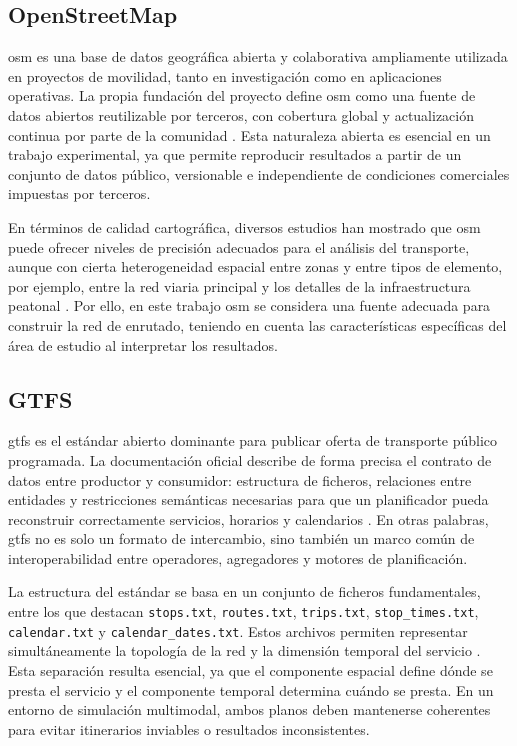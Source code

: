 \subsection{OpenStreetMap}

\gls{osm} es una base de datos geográfica abierta y colaborativa ampliamente utilizada en proyectos de movilidad, tanto en investigación como en aplicaciones operativas. La propia fundación del proyecto define \gls{osm} como una fuente de datos abiertos reutilizable por terceros, con cobertura global y actualización continua por parte de la comunidad \cite{OSMAbout}. Esta naturaleza abierta es esencial en un trabajo experimental, ya que permite reproducir resultados a partir de un conjunto de datos público, versionable e independiente de condiciones comerciales impuestas por terceros.\newline

En términos de calidad cartográfica, diversos estudios han mostrado que \gls{osm} puede ofrecer niveles de precisión adecuados para el análisis del transporte, aunque con cierta heterogeneidad espacial entre zonas y entre tipos de elemento, por ejemplo, entre la red viaria principal y los detalles de la infraestructura peatonal \cite{Haklay2010}. Por ello, en este trabajo \gls{osm} se considera una fuente adecuada para construir la red de enrutado, teniendo en cuenta las características específicas del área de estudio al interpretar los resultados.

\subsection{GTFS}

\gls{gtfs} es el estándar abierto dominante para publicar oferta de transporte público programada. La documentación oficial describe de forma precisa el contrato de datos entre productor y consumidor: estructura de ficheros, relaciones entre entidades y restricciones semánticas necesarias para que un planificador pueda reconstruir correctamente servicios, horarios y calendarios \cite{GTFSReference}. En otras palabras, \gls{gtfs} no es solo un formato de intercambio, sino también un marco común de interoperabilidad entre operadores, agregadores y motores de planificación.

La estructura del estándar se basa en un conjunto de ficheros fundamentales, entre los que destacan \texttt{stops.txt}, \texttt{routes.txt}, \texttt{trips.txt}, \texttt{stop\_times.txt}, \texttt{calendar.txt} y \texttt{calendar\_dates.txt}. Estos archivos permiten representar simultáneamente la topología de la red y la dimensión temporal del servicio \cite{GTFSReference}. Esta separación resulta esencial, ya que el componente espacial define dónde se presta el servicio y el componente temporal determina cuándo se presta. En un entorno de simulación multimodal, ambos planos deben mantenerse coherentes para evitar itinerarios inviables o resultados inconsistentes.

